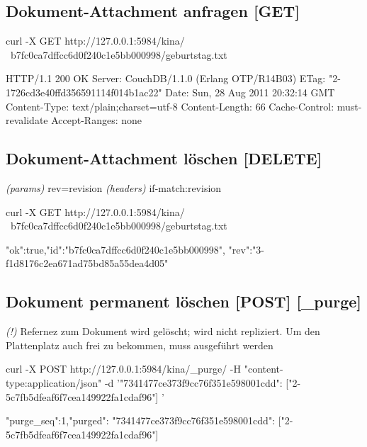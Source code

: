 \documentclass[19pt,landscape,twocolumn]{article}
\newcommand{\mono}[1]{\texttt{\textendash\textendash {#1}}}
\newcommand{\htmlverb}[1]{{[}\textbf{{#1}}{]}}
\newcommand{\setparskip}{\setlength{\parskip}{-6mm}}
\newcommand{\resetparskip}{\setlength{\parskip}{1mm}}
\begin{document}
\subsection{Dokument-Attachment anfragen \htmlverb{GET}}

\begin{code}
curl -X GET http://127.0.0.1:5984/kina/ \
  b7fc0ca7dffcc6d0f240c1e5bb000998/geburtstag.txt
\end{code}
\setparskip
\begin{response}
HTTP/1.1 200 OK
Server: CouchDB/1.1.0 (Erlang OTP/R14B03)
ETag: "2-1726cd3e40ffd356591114f014b1ac22"
Date: Sun, 28 Aug 2011 20:32:14 GMT
Content-Type: text/plain;charset=utf-8
Content-Length: 66
Cache-Control: must-revalidate
Accept-Ranges: none
\end{response}
\resetparskip

\subsection{Dokument-Attachment löschen \htmlverb{DELETE}}
\emph{(params)} rev=revision \newline
\emph{(headers)} if-match:revision

\begin{code}
curl -X GET http://127.0.0.1:5984/kina/ \
    b7fc0ca7dffcc6d0f240c1e5bb000998/geburtstag.txt
\end{code}
\setparskip
\begin{response}
{"ok":true,"id":"b7fc0ca7dffcc6d0f240c1e5bb000998",
 "rev":"3-f1d8176c2ea671ad75bd85a55dea4d05"}
\end{response}
\resetparskip

\subsection{Dokument permanent löschen \htmlverb{POST} \htmlverb{\_purge}}
\emph{(!)} Refernez zum Dokument wird gelöscht; wird nicht repliziert. Um den\newline 
Plattenplatz auch frei zu bekommen, muss \mono{\_compact} ausgeführt werden

\begin{code}
curl -X POST http://127.0.0.1:5984/kina/_purge/ 
  -H "content-type:application/json" 
  -d '{"7341477ce373f9cc76f351e598001cdd": 
        ["2-5c7fb5dfeaf6f7cea149922fa1cdaf96"]
     }'
\end{code}
\setparskip
\begin{response}
{"purge_seq":1,"purged":{
  "7341477ce373f9cc76f351e598001cdd":
    ["2-5c7fb5dfeaf6f7cea149922fa1cdaf96"]
  }
}
\end{response}
\resetparskip
\end{document}
